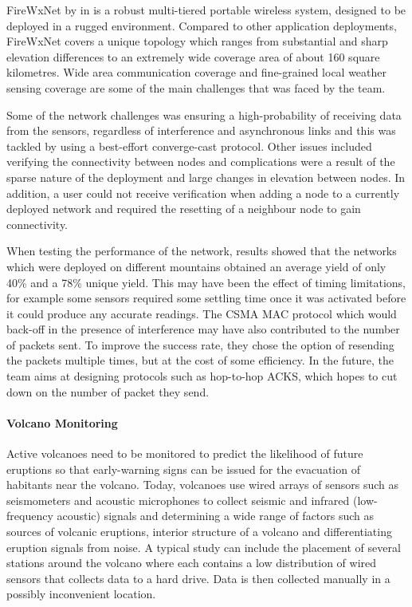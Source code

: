 FireWxNet by \citeauthor{FireWxNet} in \cite{FireWxNet} is a robust multi-tiered portable wireless system, designed to be deployed in a rugged environment. Compared to other application deployments, FireWxNet covers a unique topology which ranges from substantial and sharp elevation differences to an extremely wide coverage area of about 160 square kilometres. Wide area communication coverage and fine-grained local weather sensing coverage are some of the main challenges that was faced by the team. 

Some of the network challenges was ensuring a high-probability of receiving data from the sensors, regardless of interference and asynchronous links and this was tackled by using a best-effort converge-cast protocol. Other issues included verifying the connectivity between nodes and complications were a result of the sparse nature of the deployment and large changes in elevation between nodes. In addition, a user could not receive verification when adding a node to a currently deployed network and required the resetting of a neighbour node to gain connectivity.

When testing the performance of the network, results showed that the networks which were deployed on different mountains obtained an average yield of only 40\% and a 78\% unique yield. This may have been the effect of timing limitations, for example some sensors required some settling time once it was activated before it could produce any accurate readings. The CSMA MAC protocol which would back-off in the presence of interference may have also contributed to the number of packets sent. To improve the success rate, they chose the option of resending the packets multiple times, but at the cost of some efficiency. In the future, the team aims at designing protocols such as hop-to-hop ACKS, which hopes to cut down on the number of packet they send.

\paragraph{Volcano Monitoring} Active volcanoes need to be monitored to predict the likelihood of future eruptions so that early-warning signs can be issued for the evacuation of habitants near the volcano. Today, volcanoes use wired arrays of sensors such as seismometers and acoustic microphones to collect seismic and infrared (low-frequency acoustic) signals and determining a wide range of factors such as sources of volcanic eruptions, interior structure of a volcano and differentiating eruption signals from noise. A typical study can include the placement of several stations around the volcano where each contains a low distribution of wired sensors that collects data to a hard drive. Data is then collected manually in a possibly inconvenient location.

